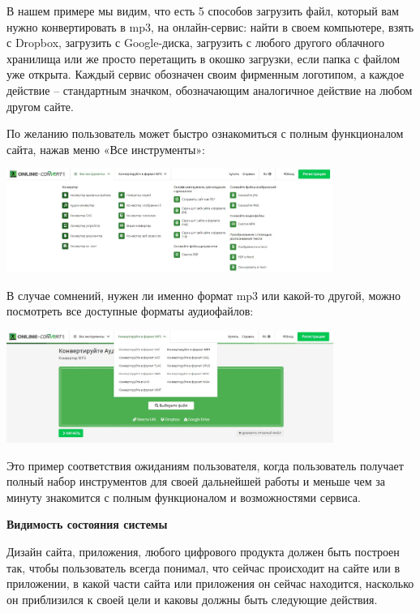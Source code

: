 В нашем примере мы видим, что есть 5 способов загрузить файл, который вам нужно конвертировать в mp3, на онлайн-сервис: найти в своем компьютере, взять с Dropbox, загрузить с Google-диска, загрузить с любого другого облачного хранилища или же просто перетащить в окошко загрузки, если папка с файлом уже открыта. Каждый сервис обозначен своим фирменным логотипом, а каждое действие – стандартным значком, обозначающим аналогичное действие на любом другом сайте.

По желанию пользователь может быстро ознакомиться с полным функционалом сайта, нажав меню «Все инструменты»:

\begin{center}
    \includegraphics[width=0.8\textwidth]{img/cxp2.jpg}
\end{center}

В случае сомнений, нужен ли именно формат mp3 или какой-то другой, можно посмотреть все доступные форматы аудиофайлов:

\begin{center}
    \includegraphics[width=0.8\textwidth]{img/cxp3.jpg}
\end{center}

Это пример соответствия ожиданиям пользователя, когда пользователь получает полный набор инструментов для своей дальнейшей работы и меньше чем за минуту знакомится с полным функционалом и возможностями сервиса.

\textbf{Видимость состояния системы}

Дизайн сайта, приложения, любого цифрового продукта должен быть построен так, чтобы пользователь всегда понимал, что сейчас происходит на сайте или в приложении, в какой части сайта или приложения он сейчас находится, насколько он приблизился к своей цели и каковы должны быть следующие действия.

